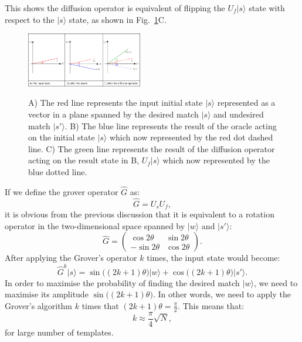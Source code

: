 \documentclass[aps,prd,nofootinbib,twocolumn,reprint,superscriptaddress,showpacs,showkeys,longbibliography]{revtex4-1}
\newcommand{\ket}[1]{|#1\rangle}
\begin{document}
This shows the diffusion operator is equivalent of flipping the $U_f\ket{s}$ state with respect to the $\ket{s}$ state, as shown in Fig.~\ref{2d0}C.
\begin{figure}[h]
{\includegraphics[width=0.45\textwidth]{Grover.png}}
{\caption{A) The red line represents the input initial state $\ket{s}$ represented as a vector in a plane spanned by the desired match $\ket{s}$ and undesired match $\ket{s'}$. B) The blue line represents the result of the oracle acting on the initial state $\ket{s}$ which now represented by the red dot dashed line. C) The green line represents the result of the diffusion operator acting on the result state in B, $U_f\ket{s}$ which now represented by the blue dotted line.   }\label{2d0}}
 \end{figure}
If we define the grover operator $\hat{G}$ as:
\begin{equation}
    \label{Gdef}
    \hat{G}= U_sU_f,
\end{equation}
it is obvious from the previous discussion that it is equivalent to a rotation operator in the two-dimensional space spanned by $\ket{w}$ and $\ket{s'}$:
\begin{equation}
    \label{Gmatrix}
    \hat{G}=\begin{pmatrix}
\cos{2\theta} & \sin{2\theta} \\
-\sin{2\theta} & \cos{2\theta} 
\end{pmatrix}.
\end{equation}
After applying the Grover's operator $k$ times, the input state would become:
\begin{equation}
    \label{Gks}
    \hat{G}^k \ket{s}= \sin{\big((2k+1)\theta\big)}\ket{w}+\cos{\big((2k+1)\theta\big)}\ket{s'}.
\end{equation}
In order to maximise the probability of finding the desired match $\ket{w}$, we need to maximise its amplitude $\sin{\big((2k+1)\theta\big)}$. In other words, we need to apply the Grover's algorithm $k$ times that $(2k+1)\theta=\frac{\pi}{2}$. This means that:
\begin{equation}
\label{k}
    k\approx\frac{\pi}{4}\sqrt{N},
\end{equation}
for large number of templates.
\newline \newline
\end{document}
